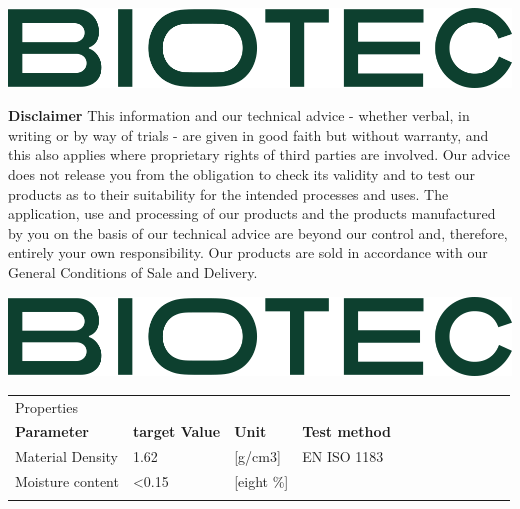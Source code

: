 \documentclass{article}
\begin{document}
\includegraphics[scale=0.30]{biotec}

\small{
	\textbf{Disclaimer} This information and our technical advice - whether verbal, in writing or by way of trials - are given in good faith but without warranty, and this also applies
	where proprietary rights of third parties are involved. Our advice does not release you from the obligation to check its validity and to test our products as to their
	suitability for the intended processes and uses. The application, use and processing of our products and the products manufactured by you on the basis of our technical
	advice are beyond our control and, therefore, entirely your own responsibility. Our products are sold in accordance with our General Conditions of Sale and Delivery.
}
\newpage

\includegraphics[scale=0.20]{biotec}
\begin{center}
		\begin{tabularx}{\textwidth}{ X l X l X l X l X l X l }
			\rowcolor{LightCyan} Properties &                       &               &                      &   & \\
			\textbf{Parameter}              & \textbf{target Value} & \textbf{Unit} & \textbf{Test method}       \\
			\arrayrulecolor{line_color}\hline
			Material Density                & 1.62                  & [g/cm3]       & EN ISO 1183          &   & \\
			\arrayrulecolor{line_color}\hline
			Moisture content                & <0.15                 & [eight \%]    &                      &     \\
			\arrayrulecolor{line_color}\hline
		\end{tabularx}
\end{center}
\end{document}
